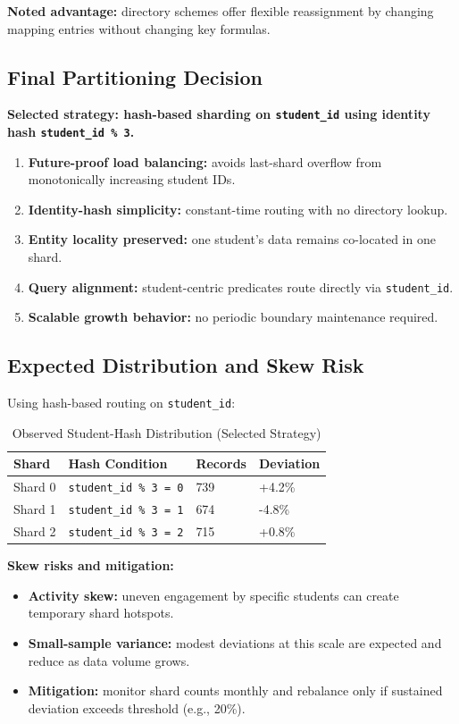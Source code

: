 \documentclass[conference]{IEEEtran}
\begin{document}
\textbf{Noted advantage:} directory schemes offer flexible reassignment by changing mapping entries without changing key formulas.

\subsection{Final Partitioning Decision}
\textbf{Selected strategy: hash-based sharding on \texttt{student\_id} using identity hash \texttt{student\_id \% 3}.}

\begin{enumerate}
    \item \textbf{Future-proof load balancing:} avoids last-shard overflow from monotonically increasing student IDs.
    \item \textbf{Identity-hash simplicity:} constant-time routing with no directory lookup.
    \item \textbf{Entity locality preserved:} one student's data remains co-located in one shard.
    \item \textbf{Query alignment:} student-centric predicates route directly via \texttt{student\_id}.
    \item \textbf{Scalable growth behavior:} no periodic boundary maintenance required.
\end{enumerate}

\subsection{Expected Distribution and Skew Risk}
Using hash-based routing on \texttt{student\_id}:

\begin{table}[htbp]
\caption{Observed Student-Hash Distribution (Selected Strategy)}
\centering
\begin{tabular}{p{1.2cm}p{2.4cm}p{1.2cm}p{1.4cm}}
\toprule
\textbf{Shard} & \textbf{Hash Condition} & \textbf{Records} & \textbf{Deviation} \\
\midrule
Shard 0 & \texttt{student\_id \% 3 = 0} & 739 & +4.2\% \\
Shard 1 & \texttt{student\_id \% 3 = 1} & 674 & -4.8\% \\
Shard 2 & \texttt{student\_id \% 3 = 2} & 715 & +0.8\% \\
\bottomrule
\end{tabular}
\label{tab:range_distribution}
\end{table}

\textbf{Skew risks and mitigation:}
\begin{itemize}
    \item \textbf{Activity skew:} uneven engagement by specific students can create temporary shard hotspots.
    \item \textbf{Small-sample variance:} modest deviations at this scale are expected and reduce as data volume grows.
    \item \textbf{Mitigation:} monitor shard counts monthly and rebalance only if sustained deviation exceeds threshold (e.g., 20\%).
\end{itemize}
\end{document}
